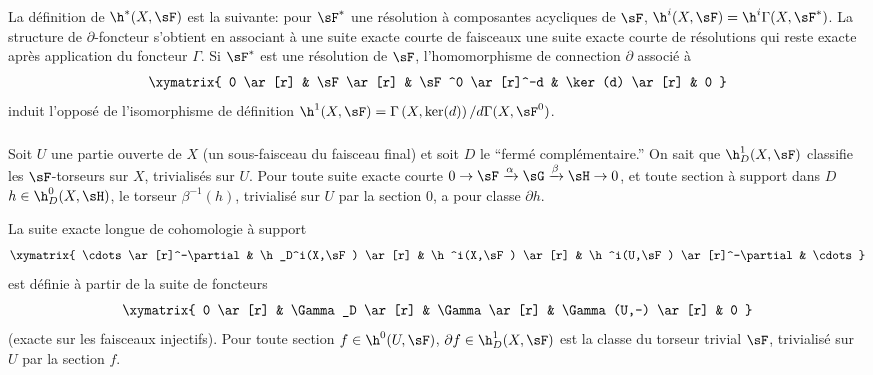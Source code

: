 \subsubsection{}\label{IV:1-1-3}

\marginpar{!}La définition de $\h^*(X,\sF)$ est la suivante: pour $\sF^*$ une 
résolution à composantes acycliques de $\sF$, 
$\h^i(X,\sF) = \h^i\Gamma(X,\sF^*)$. La structure de $\partial$-foncteur 
s'obtient en associant à une suite exacte courte de faisceaux une suite 
exacte courte de résolutions qui reste exacte après application du 
foncteur $\Gamma$. Si $\sF^*$ est une résolution de $\sF$, 
l'homomorphisme de connection $\partial$ associé à 
\[\xymatrix{
  0 \ar[r]
    & \sF \ar[r]
    & \sF^0 \ar[r]^-d 
    & \ker(d) \ar[r] 
    & 0
}\]
induit l'opposé de l'isomorphisme de définition 
$\h^1(X,\sF) = \Gamma\left(X,\ker(d)\right)/d \Gamma(X,\sF^0)$. 





\subsubsection{}\label{IV:1-1-4}

Soit $U$ une partie ouverte de $X$ (un sous-faisceau du faisceau final) et 
soit $D$ le ``fermé complémentaire.'' On sait que $\h_D^1(X,\sF)$ 
classifie les $\sF$-torseurs sur $X$, trivialisés sur $U$. Pour toute suite 
exacte courte $0\to \sF\xrightarrow\alpha \sG\xrightarrow\beta\sH\to 0$, et 
toute section à support dans $D$ $h\in\h_D^0(X,\sH)$, le torseur 
$\beta^{-1}(h)$, trivialisé sur $U$ par la section $0$, a pour classe 
$\partial h$.

La suite exacte longue de cohomologie à support
\[\xymatrix{
  \cdots \ar[r]^-\partial 
    & \h_D^i(X,\sF) \ar[r] 
    & \h^i(X,\sF) \ar[r]
    & \h^i(U,\sF) \ar[r]^-\partial 
    & \cdots
}\]
est définie à partir de la suite de foncteurs 
\[\xymatrix{
  0 \ar[r] 
    & \Gamma_D \ar[r] 
    & \Gamma \ar[r] 
    & \Gamma(U,-) \ar[r] 
    & 0
}\]
(exacte sur les faisceaux injectifs). Pour toute section $f\in \h^0(U,\sF)$, 
$\partial f\in \h_D^1(X,\sF)$ est la classe du torseur trivial $\sF$, 
trivialisé sur $U$ par la section $f$. 





\subsubsection{}\label{IV:1-1-5}

